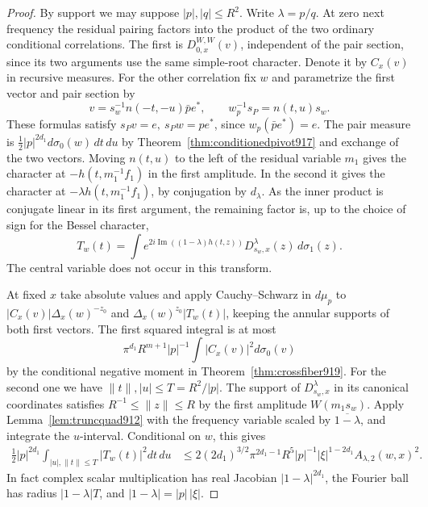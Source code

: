 \documentclass[a4paper,11pt]{article}
\theoremstyle{definition}
\theoremstyle{remark}
\numberwithin{equation}{section}
\begin{document}
\begin{proof}
By support we may suppose \(|p|,|q|\le R^2\).
Write \(\lambda=p/q\). At zero next frequency the residual
pairing factors into the product of the two ordinary
conditional correlations. The first is \(D_{0,x}^{W,W}(v)\),
independent of the pair section, since its two arguments use
the same simple-root character. Denote it by \(C_x(v)\) in
recursive measures. For the other correlation fix \(w\) and
parametrize the first vector and pair section by
\[
      v=s_w^{-1}n(-t,-u)\bar p e^*,\qquad
      w_p^{-1}s_P=n(t,u)s_w .
\]
These formulas satisfy \(s_Pv=e,\ s_P w=p e^*\), since
\(w_p(\bar p e^*)=e\). The pair measure is
\(\tfrac12 |p|^{2d_1}d\sigma_0(w)\,dt\,du\) by
Theorem~\ref{thm:conditionedpivot917} and exchange of the
two vectors. Moving \(n(t,u)\) to the left of the residual
variable \(m_1\) gives the character at \(-h(t,m_1^{-1}f_1)\)
in the first amplitude. In the second it gives the character
at \(-\lambda h(t,m_1^{-1}f_1)\), by conjugation by \(d_\lambda\).
As the inner product is conjugate linear in its first
argument, the remaining factor is, up to the choice of sign
for the Bessel character,
\[
      T_w(t)=\int e^{2i\operatorname{Im}((1-\lambda)h(t,z))}
                        D^\lambda_{s_w,x}(z)\,d\sigma_1(z).
\]
The central variable does not occur in this transform.

At fixed \(x\) take absolute values and apply Cauchy--Schwarz
in \(d\mu_p\) to
\(|C_x(v)|\Delta_x(w)^{-z_0}\) and
\(\Delta_x(w)^{z_0}|T_w(t)|\), keeping the annular supports
of both first vectors. The first squared integral is at most
\[
    \pi^{d_1}R^{m+1}|p|^{-1}
                         \int |C_x(v)|^2d\sigma_0(v)
\]
by the conditional negative moment in
Theorem~\ref{thm:crossfiber919}. For the second one we have
\(\|t\|,|u|\le T=R^2/|p|\). The support of
\(D^\lambda_{s_w,x}\) in its canonical coordinates satisfies
\(R^{-1}\le\|z\|\le R\) by the first amplitude \(W(m_1s_w)\).
Apply Lemma~\ref{lem:truncquad912} with the frequency
variable scaled by \(\overline{1-\lambda}\), and integrate
the \(u\)-interval. Conditional on \(w\), this gives
\begin{align}
 \tfrac12 |p|^{2d_1}\int_{|u|,\|t\|\le T}|T_w(t)|^2dt\,du
 &\le 2(2d_1)^{3/2}\pi^{2d_1-1}R^5
          |p|^{-1}|\xi|^{1-2d_1} A_{\lambda,2}(w,x)^2 .
 \label{eq:reciprocalplancherel921}
\end{align}
In fact complex scalar multiplication has real Jacobian
\(|1-\lambda|^{2d_1}\), the Fourier ball has radius
\(|1-\lambda|T\), and \(|1-\lambda|=|p|\,|\xi|\).


\end{proof}
\end{document}
